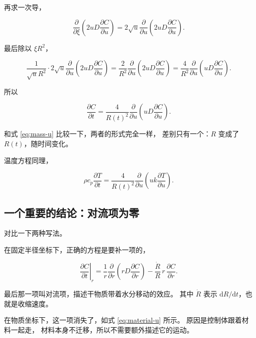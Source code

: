再求一次导，

\begin{equation}
\frac{\partial}{\partial \xi}\left(2uD\frac{\partial C}{\partial u}\right)
= 2\sqrt{u}\frac{\partial}{\partial u}\left(2uD\frac{\partial C}{\partial u}\right).
\end{equation}

最后除以 $\xi R^2$，

\begin{equation}
\frac{1}{\sqrt{u}R^2}\cdot 2\sqrt{u}\frac{\partial}{\partial u}\left(2uD\frac{\partial C}{\partial u}\right)
= \frac{2}{R^2}\frac{\partial}{\partial u}\left(2uD\frac{\partial C}{\partial u}\right)
= \frac{4}{R^2}\frac{\partial}{\partial u}\left(uD\frac{\partial C}{\partial u}\right).
\end{equation}

所以

\begin{equation}
\boxed{\;
\frac{\partial C}{\partial t} = \frac{4}{R(t)^2}\frac{\partial}{\partial u}\left(uD\frac{\partial C}{\partial u}\right).
\;}
\label{eq:material-u}
\end{equation}

和式 \eqref{eq:mass-u} 比较一下，两者的形式完全一样，
差别只有一个：$R$ 变成了 $R(t)$，随时间变化。

温度方程同理，

\begin{equation}
\rho c_p\frac{\partial T}{\partial t} = \frac{4}{R(t)^2}\frac{\partial}{\partial u}\left(uk\frac{\partial T}{\partial u}\right).
\end{equation}

\subsection{一个重要的结论：对流项为零}

对比一下两种写法。

在固定半径坐标下，正确的方程是要补一项的，

\begin{equation}
\left.\frac{\partial C}{\partial t}\right|_r
= \frac{1}{r}\frac{\partial}{\partial r}\left(rD\frac{\partial C}{\partial r}\right)
- \frac{\dot R}{R}\,r\,\frac{\partial C}{\partial r}.
\label{eq:radv}
\end{equation}

最后那一项叫对流项，描述干物质带着水分移动的效应。
其中 $\dot R$ 表示 $\mathrm{d}R/\mathrm{d}t$，也就是收缩速度。

在物质坐标下，这一项消失了，如式 \eqref{eq:material-u} 所示。
原因是控制体跟着材料一起走，
材料本身不迁移，所以不需要额外描述它的运动。

